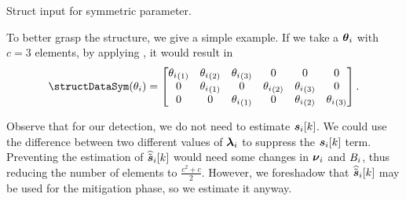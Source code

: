 \documentclass[../main.tex]{subfiles}
\begin{document}
\begin{algorithm2e}[h]
  \DontPrintSemicolon%
          \caption{Struct input for symmetric parameter.}\label{alg:struct_symmetric}
        \end{algorithm2e}
To better grasp the structure, we give a simple example.
If we take a $\boldsymbol{\theta}_i$ with ${c=3}$ elements, by applying \structDataSym, it would result in
\begin{equation}
  \text{\structDataSym}(\theta_i)=
  \left[
  \begin{matrix}
     \elem[1]{\theta_{i}}  &   \elem[2]{\theta_{i}}   &  \elem[3]{\theta_{i}} &    0  &   0  &   0 \\
     0  &   \elem[1]{\theta_{i}}   &  0 &    \elem[2]{\theta_{i}}  &   \elem[3]{\theta_{i}}  &   0 \\
     0  &   0   &  \elem[1]{\theta_{i}} &    0  &   \elem[2]{\theta_{i}}  &   \elem[3]{\theta_{i}}
  \end{matrix}
  \right].
\end{equation}

\begin{remark}
  Observe that for our detection, we do not need to estimate $\boldsymbol{s}_{i}[k]$.
  We could use the difference between two different values of $\boldsymbol{\lambda}_i$ to suppress the $\boldsymbol{s}_{i}[k]$ term.
  Preventing the estimation of $\widehat{\tilde{\boldsymbol{s}}}_{i}[k]$ would need some changes in ${\boldsymbol{\nu}_{i}}$ and ${B_i}$, thus reducing the number of elements to ${\frac{c^{2}+c}{2}}$.
  However, we foreshadow that $\widehat{\tilde{\boldsymbol{s}}}_{i}[k]$ may be used for the mitigation phase, so we estimate it anyway.
\end{remark}
\end{document}
